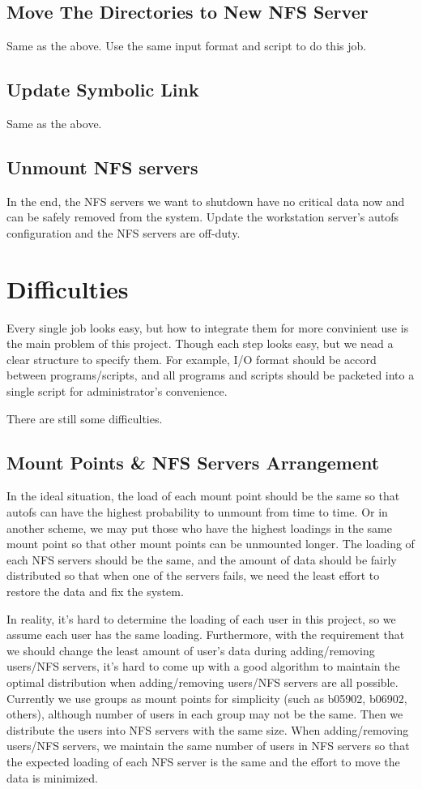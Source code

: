 \documentclass{article}
\begin{document}
\subsection{Move The Directories to New NFS Server}
Same as the above. Use the same input format and script to do this job.
\subsection{Update Symbolic Link}
Same as the above.
\subsection{Unmount NFS servers}
In the end, the NFS servers we want to shutdown have no critical data now and can be safely removed from the system. Update the workstation server's autofs configuration and the NFS servers are off-duty.
\section{Difficulties}
Every single job looks easy, but how to integrate them for more convinient use is the main problem of this project.
Though each step looks easy, but we nead a clear structure to specify them. For example, I/O format should be 
accord between programs/scripts, and all programs and scripts should be packeted into a single script for administrator's convenience.

There are still some difficulties.

\subsection{Mount Points \& NFS Servers Arrangement}
In the ideal situation, the load of each mount point should be the same so that autofs can have the highest probability to unmount from time to time. Or in another scheme, we may put those who have the highest loadings in the same mount point so that other mount points can be unmounted longer. The loading of each NFS servers should be the same, and the amount of data should be fairly distributed so that when one of the servers fails, we need the least effort to restore the data and fix the system.

In reality, it's hard to determine the loading of each user in this project, so we assume each user has the same loading. Furthermore, with the requirement that we should change the least amount of user's data during adding/removing users/NFS servers, it's hard to come up with a good algorithm to maintain the optimal distribution when adding/removing users/NFS servers are all possible. Currently we use groups as mount points for simplicity (such as b05902, b06902, others), although number of users in each group may not be the same. Then we distribute the users into NFS servers with the same size. When adding/removing users/NFS servers, we maintain the same number of users in NFS servers so that the expected loading of each NFS server is the same and the effort to move the data is minimized.
\end{document}
